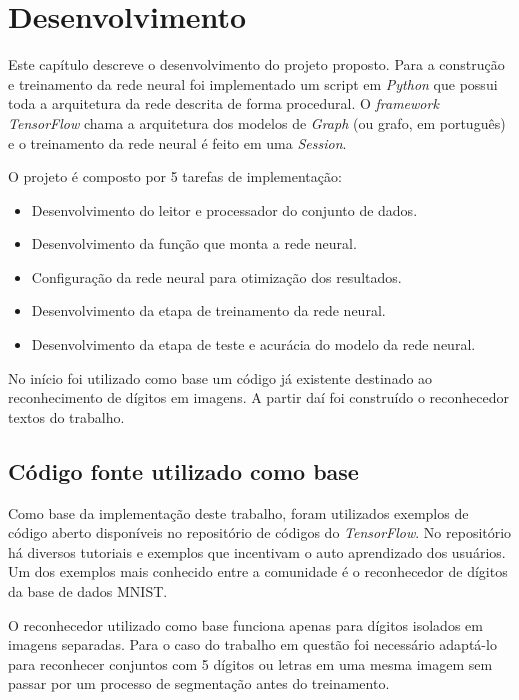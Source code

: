 \chapter{Desenvolvimento}

Este capítulo descreve o desenvolvimento do projeto proposto. 
Para a construção e treinamento da rede neural foi implementado um
script em \textit{Python} que possui toda a arquitetura da rede
descrita de forma procedural. O \textit{framework} \textit{TensorFlow}
chama a arquitetura dos modelos de \textit{Graph} (ou grafo, em
português) e o treinamento da rede neural é feito em uma
\textit{Session}.

O projeto é composto por 5 tarefas de implementação: 

\begin{itemize}

\item Desenvolvimento do leitor e processador do conjunto de dados.

\item Desenvolvimento da função que monta a rede neural.

\item Configuração da rede neural para otimização dos resultados.

\item Desenvolvimento da etapa de treinamento da rede neural.

\item Desenvolvimento da etapa de teste e acurácia do modelo da rede
  neural.

\end{itemize}

No início foi utilizado como base um código já existente destinado ao
reconhecimento de dígitos em imagens. A partir daí foi construído o
reconhecedor textos do trabalho.

\section{Código fonte utilizado como base} \label{codigoBase}

Como base da implementação deste trabalho, foram utilizados exemplos
de código aberto disponíveis no repositório de códigos do
\textit{TensorFlow}\cite{tensorCode}. No repositório há diversos
tutoriais e exemplos que incentivam o auto aprendizado dos
usuários. Um dos exemplos mais conhecido entre a comunidade é o
reconhecedor de dígitos da base de dados MNIST\cite{mnist}.

O reconhecedor utilizado como base funciona apenas para dígitos
isolados em imagens separadas. Para o caso do trabalho em questão
foi necessário adaptá-lo para reconhecer conjuntos com 5 dígitos ou
letras em uma mesma imagem sem passar por um processo de segmentação
antes do treinamento.

